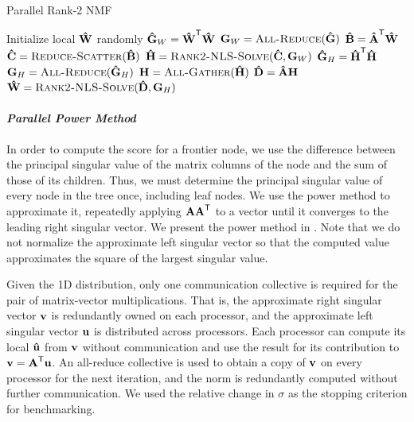 \documentclass[conference,compsoc]{IEEEtran}
\begin{document}
\begin{algorithm}
\caption{Parallel Rank-2 NMF}
\label{alg:parrank2nmf}
\begin{algorithmic}[1]
		\State Initialize local $\M[\hat]{W}$ randomly
			\State {}
			\State $\M[\hat]{G}_W = \M[\hat]{W}^\Tra \M[\hat]{W}$
			\State $\M{G}_W = \textsc{All-Reduce}(\M[\hat]{G})$
			\State $\M[\hat]{B} = \M[\hat]{A}^\Tra \M[\hat]{W}$ %
			\State $\M[\hat]{C} = \textsc{Reduce-Scatter}(\M[\hat]{B})$
			\State $\M[\hat]{H} = \textsc{Rank2-NLS-Solve}(\M[\hat]{C},\M{G}_W)$
			\State {}
			\State $\M[\hat]{G}_H = \M[\hat]{H}^\Tra \M[\hat]{H}$
			\State $\M{G}_H = \textsc{All-Reduce}(\M[\hat]{G}_H)$
			\State $\M{H} = \textsc{All-Gather}(\M[\hat]{H})$
			\State $\M[\hat]{D} = \M[\hat]{A} \M{H}$ %
			\State $\M[\hat]{W} = \textsc{Rank2-NLS-Solve}(\M[\hat]{D},\M{G}_H)$
		\EndWhile
	\EndFunction
\end{algorithmic}
\end{algorithm}

\paragraph{\emph{Parallel Power Method}}

In order to compute the score for a frontier node, we use the difference between the principal singular value of the matrix columns of the node and the sum of those of its children.
Thus, we must determine the principal singular value of every node in the tree once, including leaf nodes.
We use the power method to approximate it, repeatedly applying $\M{A}\M{A}^\Tra$ to a vector until it converges to the leading right singular vector.
We present the power method in .
Note that we do not normalize the approximate left singular vector so that the computed value approximates the square of the largest singular value.

Given the 1D distribution, only one communication collective is required for the pair of matrix-vector multiplications.
That is, the approximate right singular vector $\V{v}$ is redundantly owned on each processor, and the approximate left singular vector $\V{u}$ is distributed across processors.
Each processor can compute its local $\V[\hat]{u}$ from $\V{v}$ without communication and use the result for its contribution to $\V{v}=\M{A}^\Tra \V{u}$.
An all-reduce collective is used to obtain a copy of $\V{v}$ on every processor for the next iteration, and the norm is redundantly computed without further communication.
We used the relative change in $\sigma$ as the stopping criterion for benchmarking.
\end{document}
